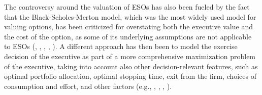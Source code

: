    The controversy around the valuation of ESOs has also been fueled by the fact that the Black-Scholes-Merton model, which was the most widely used model for valuing options, has been criticized for overstating both the executive value and the cost of the option, as some of its underlying assumptions are not applicable to ESOs (\cite{carpenter1998exercise}, \cite{meulbroek2001efficiency}, \cite{hall2003trouble}, \cite{ingersoll2006subjective}, \cite{carpenter2010optimal} \cite{frydman2010ceo}). A different approach has then been to model the exercise decision of the executive as part of a more comprehensive maximization problem of the executive, taking into account also other decision-relevant features, such as optimal portfolio allocation, optimal stopping time, exit from the firm, choices of consumption and effort, and other factors (e.g., \cite{huddart1996employee}, \cite{ingersoll2006subjective}, \cite{grasselli2009risk}, \cite{carpenter2010optimal}). %

